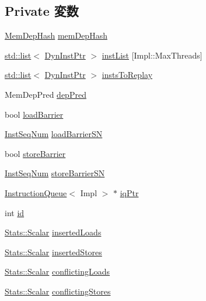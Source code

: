 \subsection*{Private 変数}
\begin{DoxyCompactItemize}
\item 
\hyperlink{classMemDepUnit_a0552beec197948e07bf69cb6ea45407e}{MemDepHash} \hyperlink{classMemDepUnit_ac0b12f9eec0e0c6b639c7370177e5c36}{memDepHash}
\item 
\hyperlink{classstd_1_1list}{std::list}$<$ \hyperlink{classRefCountingPtr}{DynInstPtr} $>$ \hyperlink{classMemDepUnit_a7f2828a4f877a4a4d4b85a6788536b82}{instList} \mbox{[}Impl::MaxThreads\mbox{]}
\item 
\hyperlink{classstd_1_1list}{std::list}$<$ \hyperlink{classRefCountingPtr}{DynInstPtr} $>$ \hyperlink{classMemDepUnit_a4c7e8849e2a4606478c2e93f9dcb6c54}{instsToReplay}
\item 
MemDepPred \hyperlink{classMemDepUnit_a2b12193ddce173c34c8c54e0201925bc}{depPred}
\item 
bool \hyperlink{classMemDepUnit_a84cd010b1d5bb1d8a72a2603a9b58393}{loadBarrier}
\item 
\hyperlink{inst__seq_8hh_a258d93d98edaedee089435c19ea2ea2e}{InstSeqNum} \hyperlink{classMemDepUnit_adbdb10ce572ac89847d1541d471f0be6}{loadBarrierSN}
\item 
bool \hyperlink{classMemDepUnit_ac066575fbaeda40cc6b2017292dfb0bf}{storeBarrier}
\item 
\hyperlink{inst__seq_8hh_a258d93d98edaedee089435c19ea2ea2e}{InstSeqNum} \hyperlink{classMemDepUnit_ae3e16866c4d84194ff7f414f00d71e94}{storeBarrierSN}
\item 
\hyperlink{classInstructionQueue}{InstructionQueue}$<$ Impl $>$ $\ast$ \hyperlink{classMemDepUnit_ae1fd26993119273f381c42894e2672c6}{iqPtr}
\item 
int \hyperlink{classMemDepUnit_a7441ef0865bcb3db9b8064dd7375c1ea}{id}
\item 
\hyperlink{classStats_1_1Scalar}{Stats::Scalar} \hyperlink{classMemDepUnit_a7810bf3f4630c9898e404e7d46900ad5}{insertedLoads}
\item 
\hyperlink{classStats_1_1Scalar}{Stats::Scalar} \hyperlink{classMemDepUnit_a5f8daf9e076650e5b9f2f9a6876a3bf7}{insertedStores}
\item 
\hyperlink{classStats_1_1Scalar}{Stats::Scalar} \hyperlink{classMemDepUnit_ad5a10b8601553be6d0f3bfa3495dd5a5}{conflictingLoads}
\item 
\hyperlink{classStats_1_1Scalar}{Stats::Scalar} \hyperlink{classMemDepUnit_ab481d99d6034a2db5e14efd072448635}{conflictingStores}
\end{DoxyCompactItemize}


